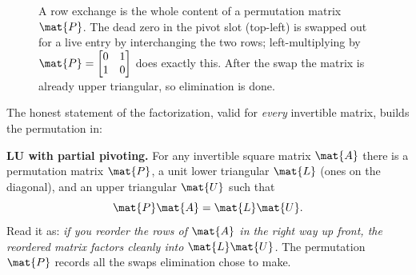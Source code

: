\begin{figure}[H]
\centering
{}
\caption{A row exchange is the whole content of a permutation matrix $\mat{P}$. The dead
zero in the pivot slot (top-left) is swapped out for a live entry by interchanging the two
rows; left-multiplying by $\mat{P}=\protect\begin{bmatrix}0&1\\1&0\protect\end{bmatrix}$ does
exactly this. After the swap the matrix is already upper triangular, so elimination is done.}
\label{ch09:fig-swap}
\end{figure}

The honest statement of the factorization, valid for \emph{every} invertible matrix, builds
the permutation in:

\begin{formalbox}
\textbf{LU with partial pivoting.} For any invertible square matrix $\mat{A}$ there is a
permutation matrix $\mat{P}$, a unit lower triangular $\mat{L}$ (ones on the diagonal), and
an upper triangular $\mat{U}$ such that
\[
  \mat{P}\mat{A} = \mat{L}\mat{U}.
\]
Read it as: \emph{if you reorder the rows of $\mat{A}$ in the right way up front, the
reordered matrix factors cleanly into $\mat{L}\mat{U}$.} The permutation $\mat{P}$ records
all the swaps elimination chose to make.
\end{formalbox}

